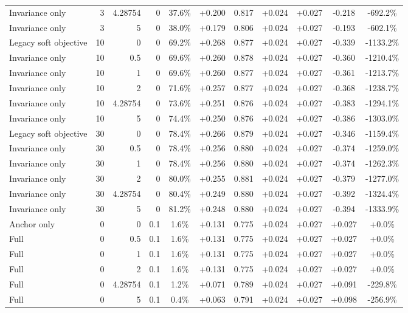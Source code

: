 \begin{table}[htbp]
\begin{tabular}{lrrrccccccc}
Invariance only & 3 & 4.28754 & 0 & 37.6\% & +0.200 & 0.817 & +0.024 & +0.027 & -0.218 & -692.2\% \\
Invariance only & 3 & 5 & 0 & 38.0\% & +0.179 & 0.806 & +0.024 & +0.027 & -0.193 & -602.1\% \\
Legacy soft objective & 10 & 0 & 0 & 69.2\% & +0.268 & 0.877 & +0.024 & +0.027 & -0.339 & -1133.2\% \\
Invariance only & 10 & 0.5 & 0 & 69.6\% & +0.260 & 0.878 & +0.024 & +0.027 & -0.360 & -1210.4\% \\
Invariance only & 10 & 1 & 0 & 69.6\% & +0.260 & 0.877 & +0.024 & +0.027 & -0.361 & -1213.7\% \\
Invariance only & 10 & 2 & 0 & 71.6\% & +0.257 & 0.877 & +0.024 & +0.027 & -0.368 & -1238.7\% \\
Invariance only & 10 & 4.28754 & 0 & 73.6\% & +0.251 & 0.876 & +0.024 & +0.027 & -0.383 & -1294.1\% \\
Invariance only & 10 & 5 & 0 & 74.4\% & +0.250 & 0.876 & +0.024 & +0.027 & -0.386 & -1303.0\% \\
Legacy soft objective & 30 & 0 & 0 & 78.4\% & +0.266 & 0.879 & +0.024 & +0.027 & -0.346 & -1159.4\% \\
Invariance only & 30 & 0.5 & 0 & 78.4\% & +0.256 & 0.880 & +0.024 & +0.027 & -0.374 & -1259.0\% \\
Invariance only & 30 & 1 & 0 & 78.4\% & +0.256 & 0.880 & +0.024 & +0.027 & -0.374 & -1262.3\% \\
Invariance only & 30 & 2 & 0 & 80.0\% & +0.255 & 0.881 & +0.024 & +0.027 & -0.379 & -1277.0\% \\
Invariance only & 30 & 4.28754 & 0 & 80.4\% & +0.249 & 0.880 & +0.024 & +0.027 & -0.392 & -1324.4\% \\
Invariance only & 30 & 5 & 0 & 81.2\% & +0.248 & 0.880 & +0.024 & +0.027 & -0.394 & -1333.9\% \\
Anchor only & 0 & 0 & 0.1 & 1.6\% & +0.131 & 0.775 & +0.024 & +0.027 & +0.027 & +0.0\% \\
Full & 0 & 0.5 & 0.1 & 1.6\% & +0.131 & 0.775 & +0.024 & +0.027 & +0.027 & +0.0\% \\
Full & 0 & 1 & 0.1 & 1.6\% & +0.131 & 0.775 & +0.024 & +0.027 & +0.027 & +0.0\% \\
Full & 0 & 2 & 0.1 & 1.6\% & +0.131 & 0.775 & +0.024 & +0.027 & +0.027 & +0.0\% \\
Full & 0 & 4.28754 & 0.1 & 1.2\% & +0.071 & 0.789 & +0.024 & +0.027 & +0.091 & -229.8\% \\
Full & 0 & 5 & 0.1 & 0.4\% & +0.063 & 0.791 & +0.024 & +0.027 & +0.098 & -256.9\% \\

\end{tabular}
\end{table}
